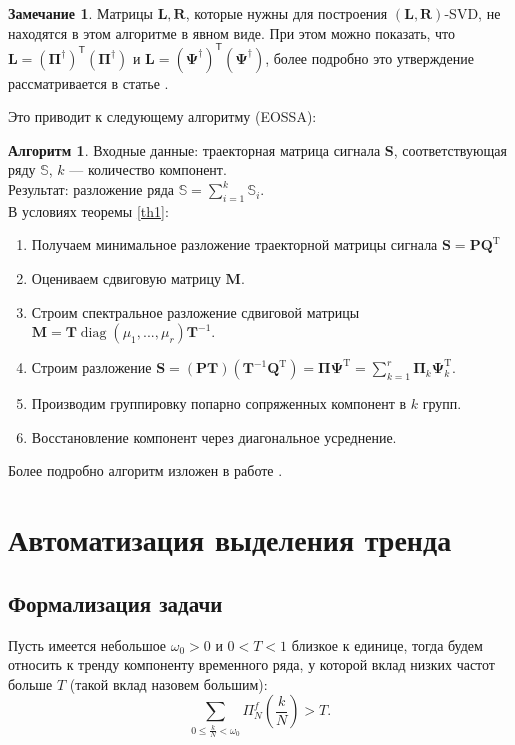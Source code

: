 \documentclass[specialist, substylefile = spbureport.rtx, subf,href,colorlinks=true, 12pt]{disser}
\theoremstyle{definition}
\newtheorem{algorithm}{Алгоритм}
\newtheorem{remark}{Замечание}
\DeclareMathOperator{\diag}{diag}
\begin{document}
\begin{remark}
    Матрицы $\mathbf{L}, \mathbf{R}$, которые нужны для построения $(\mathbf{L}, \mathbf{R})$-SVD, не находятся в этом алгоритме в явном виде. При этом можно показать, что $\mathbf{L} = (\mathbf{\Pi}^{\dag})^{\mathsf{T}}(\mathbf{\Pi}^{\dag})$ и $\mathbf{L} = (\mathbf{\Psi}^{\dag})^{\mathsf{T}}(\mathbf{\Psi}^{\dag})$, более подробно это утверждение рассматривается в статье \cite{Golyandina15}.
\end{remark}
Это приводит к следующему алгоритму (EOSSA):
\begin{algorithm}
Входные данные: траекторная матрица сигнала $\mathbf{S}$, соответствующая ряду $\mathbb{S}$, $k$ --- количество компонент.\\
Результат: разложение ряда $\mathbb{S} = \sum_{i = 1}^{k}\mathbb{S}_i$.\\
В условиях теоремы \ref{th1}:
\label{alg4}
    \begin{enumerate}
            \item Получаем минимальное разложение траекторной матрицы сигнала $\mathbf{S} = \mathbf{PQ}^{\mathrm{T}}$
            \item Оцениваем сдвиговую матрицу $\mathbf{M}$.
            \item Строим спектральное разложение сдвиговой матрицы $\mathbf{M} = \mathbf{T}\diag (\mu_1, ..., \mu_r)\mathbf{T}^{-1}$.
            \item Строим разложение $\mathbf{S} = (\mathbf{PT})(\mathbf{T}^{-1}\mathbf{Q}^{\mathrm{T}}) = \mathbf{\Pi \Psi}^{\mathrm{T}} = \sum_{k = 1}^{r}\mathbf{\Pi}_k\mathbf{\Psi}^{\mathrm{T}}_k$.
            \item Производим группировку попарно сопряженных компонент в $k$ групп.
            \item Восстановление компонент через диагональное усреднение. 
        \end{enumerate}
\end{algorithm}
Более подробно алгоритм изложен в работе \cite{Shlemov}.




\chapter{Автоматизация выделения тренда}
\section{Формализация задачи}
Пусть имеется небольшое $\omega_0 > 0$ и $0 < T < 1$ близкое к единице, тогда будем относить к тренду компоненту временного ряда, у которой вклад низких частот больше $T$ (такой вклад назовем большим):
\begin{equation*}
    \sum\limits_{0 \leq \frac{k}{N} < \omega_0}\Pi_N^f(\frac{k}{N}) > T.
\end{equation*}
\end{document}
